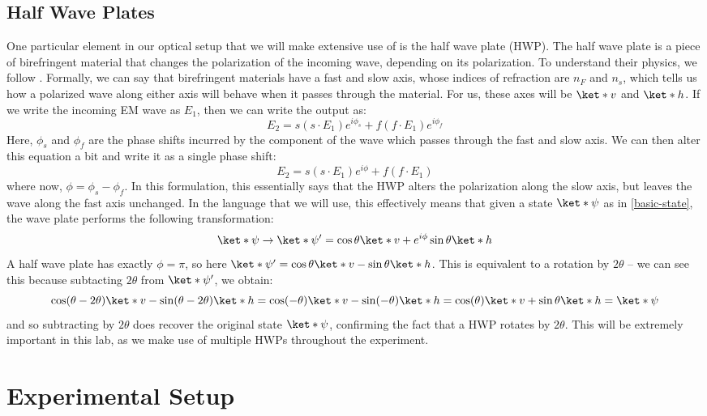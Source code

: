 \documentclass[10pt]{article}
\begin{document}
	\subsection{Half Wave Plates}
	One particular element in our optical setup that we will make extensive use of is the half wave plate
	(HWP). 
	The half wave plate is a piece of birefringent material that changes the polarization of the incoming
	wave, depending on its polarization. To understand their physics, we follow \cite{foptics}. 
	Formally, we can say that birefringent materials have a fast and
	slow axis, whose indices of refraction are \( n_F \) and \( n_s \), which tells us how a polarized wave
	along either axis will behave when it passes through the material. For us, these axes will be \( \ket*{v}
	\) and \( \ket*{h} \). If we write the incoming EM wave as \( E_1
	\), then we can write the output as:
	\[
		E_2 = s(s \cdot E_1) e^{i \phi_s} + f(f \cdot E_1) e^{i \phi_f}
	\]
	Here, \( \phi_s \) and \( \phi_f \) are the phase shifts incurred by the component of the wave which
	passes through the fast and slow axis. We can then alter this equation a bit and write it as a single
	phase shift:
	\[
		E_2 = s(s \cdot E_1) e^{i \phi} + f(f \cdot E_1)
	\]
	where now, \( \phi = \phi_s - \phi_f \). In this formulation, this essentially says that the HWP alters
	the polarization along the slow axis, but leaves the wave along the fast axis unchanged. In the language
	that we will use, this effectively means that given a state \( \ket*{\psi} \) as in  \ref{basic-state},
	the wave plate performs the following transformation:
	\[
		\ket*{\psi} \to \ket*{\psi'} = \cos \theta \ket*{v} + e^{i \phi} \sin \theta \ket*{h}
	\]
	A half wave plate has exactly \( \phi = \pi \), so here \( \ket*{\psi'} = \cos \theta \ket*{v} - \sin \theta
	\ket*{h} \). This is equivalent to a rotation by \( 2\theta \) -- we can see this because subtacting \(
	2\theta \) from \( \ket*{\psi'} \), we obtain:
	\[
		\cos(\theta - 2\theta) \ket*{v} - \sin(\theta - 2\theta) \ket*{h} = \cos(-\theta) \ket*{v} -
		\sin(-\theta) \ket*{h} = \cos(\theta) \ket*{v} + \sin \theta \ket*{h} = \ket*{\psi}
	\]
	and so subtracting by \( 2\theta \) does recover the original state \( \ket*{\psi} \), confirming the
	fact that a HWP rotates by \( 2\theta \). This will be extremely important in this lab, as we make use of
	multiple HWPs throughout the experiment. 


	\section{Experimental Setup}
\end{document}
